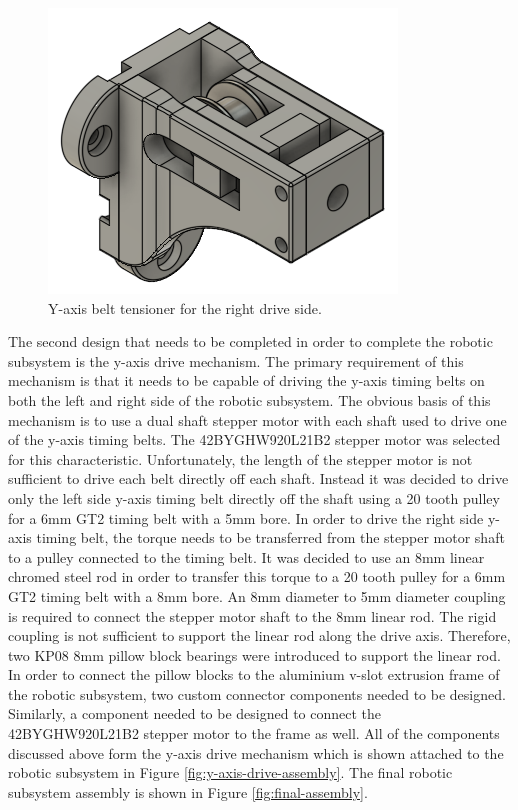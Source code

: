 \begin{figure}[H]
	\centering
	\includegraphics[width=0.4\linewidth]{figures/y-axis-belt-tensioner-right.png}
	\caption{Y-axis belt tensioner for the right drive side.}
	\label{fig:y-axis-belt-tensioner-right}
\end{figure}

The second design that needs to be completed in order to complete the robotic subsystem is the y-axis drive mechanism. The primary requirement of this mechanism is that it needs to be capable of driving the y-axis timing belts on both the left and right side of the robotic subsystem. The obvious basis of this mechanism is to use a dual shaft stepper motor with each shaft used to drive one of the y-axis timing belts. The 42BYGHW920L21B2 stepper motor was selected for this characteristic. Unfortunately, the length of the stepper motor is not sufficient to drive each belt directly off each shaft. Instead it was decided to drive only the left side y-axis timing belt directly off the shaft using a 20 tooth pulley for a 6mm GT2 timing belt with a 5mm bore. In order to drive the right side y-axis timing belt, the torque needs to be transferred from the stepper motor shaft to a pulley connected to the timing belt. It was decided to use an 8mm linear chromed steel rod in order to transfer this torque to a 20 tooth pulley for a 6mm GT2 timing belt with a 8mm bore. An 8mm diameter to 5mm diameter coupling is required to connect the stepper motor shaft to the 8mm linear rod. The rigid coupling is not sufficient to support the linear rod along the drive axis. Therefore, two KP08 8mm pillow block bearings were introduced to support the linear rod. In order to connect the pillow blocks to the aluminium v-slot extrusion frame of the robotic subsystem, two custom connector components needed to be designed. Similarly, a component needed to be designed to connect the 42BYGHW920L21B2 stepper motor to the frame as well. All of the components discussed above form the y-axis drive mechanism which is shown attached to the robotic subsystem in Figure \ref{fig:y-axis-drive-assembly}. The final robotic subsystem assembly is shown in Figure \ref{fig:final-assembly}.

